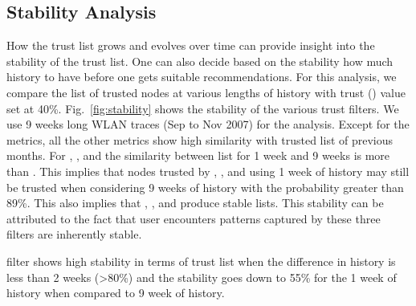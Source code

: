 \documentclass[10pt,conference]{IEEEtran}
\begin{document}
\subsection{Stability Analysis}

\begin{figure*}
  \begin{center}
\renewcommand{\thesubfigure}{\Alph{subfigure}.}

    \centering
    

    \caption{Comparison of trust list belonging to different history for various filters at T=40\% (note that the y-axis scale for , , and  starts at 85\% and for   and  the scale starts at 35\%)}
    \label{fig:stability}
  \end{center}
\end{figure*}



How the trust list grows and evolves over time can provide insight into the stability of the trust list. One can also decide based on the stability how much history to have before one gets suitable recommendations. For this analysis, we compare the list of trusted nodes at various lengths of history with trust () value set at 40\%. Fig.~\ref{fig:stability} shows the stability of the various trust filters. We use 9 weeks long WLAN traces (Sep to Nov 2007) for the analysis. Except for the  metrics, all the other metrics show high similarity with trusted list of previous months. For , , and  the similarity between list for 1 week and 9 weeks is more than . This implies that nodes trusted by , , and  using 1 week of history may still be trusted when considering 9 weeks of history with the probability greater than 89\%. This also implies that , , and  produce stable lists. This stability can be attributed to the fact that user encounters patterns captured by these three filters are inherently stable. 

 filter shows high stability in terms of trust list when the difference in history is less than 2 weeks (\textgreater 80\%) and the stability goes down to 55\% for the 1 week of history when compared to 9 week of history. 
\end{document}
